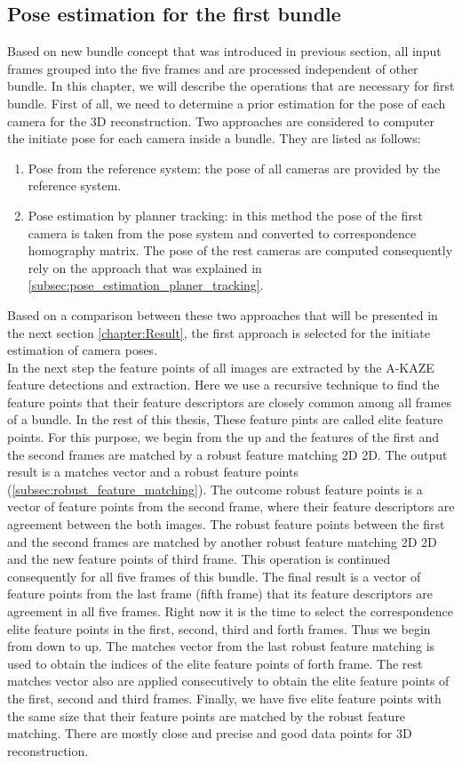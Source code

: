 \subsection{Pose estimation for the first bundle}\label{subsec:pose_first_bundle}
Based on new bundle concept that was introduced in previous section, all input frames grouped into the five frames and are processed independent of other bundle. In this chapter, we will describe the operations that are necessary for first bundle.
First of all, we need to determine a prior estimation for the pose of each camera for the 3D reconstruction. Two approaches are considered to computer the initiate pose for each camera inside a bundle. They are listed as follows:
\begin{enumerate}
\item Pose from the reference system: the pose of all cameras are provided by the reference system.
\item Pose estimation by planner tracking: in this method the pose of the first camera is taken from the pose system and converted to correspondence homography matrix. The pose of the rest cameras are computed consequently rely on the approach that was explained in \autoref{subsec:pose_estimation_planer_tracking}.
\end{enumerate}
Based on a comparison between these two approaches that will be presented in the next section \autoref{chapter:Result}, the first approach is selected for the initiate estimation of camera poses.\\
In the next step the feature points of all images are extracted by the A-KAZE feature detections and extraction. Here we use a recursive technique to find the feature points that their feature descriptors are closely common among all frames of a bundle. In the rest of this thesis, These feature pints are called elite feature points.
 For this purpose, we begin from the up and the features of the first and the second frames are matched by a robust feature matching 2D 2D. The output result is a matches vector and a robust feature points (\autoref{subsec:robust_feature_matching}). The outcome robust feature points is a vector of feature points from the second frame, where their feature descriptors are agreement between the both images. The robust feature points between the first and the second frames are matched by another robust feature matching 2D 2D and the new feature points of third frame. This operation is continued consequently for all five frames of this bundle. The final result is a vector of feature points from the last frame (fifth frame) that its feature descriptors are agreement in all five frames. Right now it is the time to select the correspondence elite feature points in the first, second, third and forth frames. Thus we begin from down to up. The matches vector from the last robust feature matching is used to obtain the indices of the elite feature points of forth frame. The rest matches vector also are applied consecutively to obtain the elite feature points of the first, second and third frames. Finally, we have five elite feature points with the same size that their feature points are matched by the robust feature matching. There are mostly close and precise and good data points for 3D reconstruction.\\
